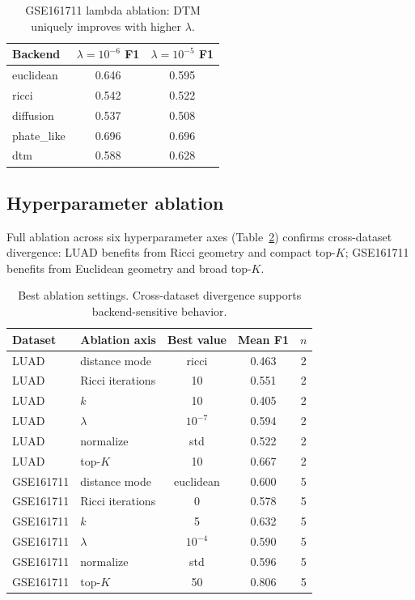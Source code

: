 \documentclass[12pt]{article}
\begin{document}
\begin{table}[h]
\centering
\small
\begin{tabular}{lcc}
\toprule
Backend & $\lambda = 10^{-6}$ F1 & $\lambda = 10^{-5}$ F1 \\
\midrule
euclidean & 0.646 & 0.595 \\
ricci & 0.542 & 0.522 \\
diffusion & 0.537 & 0.508 \\
phate\_like & 0.696 & 0.696 \\
dtm & 0.588 & 0.628 \\
\bottomrule
\end{tabular}
\caption{GSE161711 lambda ablation: DTM uniquely improves with higher $\lambda$.}
\label{tab:lambda_gse}
\end{table}

\subsection{Hyperparameter ablation}
\label{sec:ablation}

Full ablation across six hyperparameter axes (Table~\ref{tab:ablationbest}) confirms cross-dataset divergence: LUAD benefits from Ricci geometry and compact top-$K$; GSE161711 benefits from Euclidean geometry and broad top-$K$.

\begin{table}[h]
\centering
\small
\begin{tabular}{@{}llccc@{}}
\toprule
Dataset & Ablation axis & Best value & Mean F1 & $n$ \\
\midrule
LUAD & distance mode & ricci & 0.463 & 2 \\
LUAD & Ricci iterations & 10 & 0.551 & 2 \\
LUAD & $k$ & 10 & 0.405 & 2 \\
LUAD & $\lambda$ & $10^{-7}$ & 0.594 & 2 \\
LUAD & normalize & std & 0.522 & 2 \\
LUAD & top-$K$ & 10 & 0.667 & 2 \\
\midrule
GSE161711 & distance mode & euclidean & 0.600 & 5 \\
GSE161711 & Ricci iterations & 0 & 0.578 & 5 \\
GSE161711 & $k$ & 5 & 0.632 & 5 \\
GSE161711 & $\lambda$ & $10^{-4}$ & 0.590 & 5 \\
GSE161711 & normalize & std & 0.596 & 5 \\
GSE161711 & top-$K$ & 50 & 0.806 & 5 \\
\bottomrule
\end{tabular}
\caption{Best ablation settings. Cross-dataset divergence supports backend-sensitive behavior.}
\label{tab:ablationbest}
\end{table}
\end{document}
